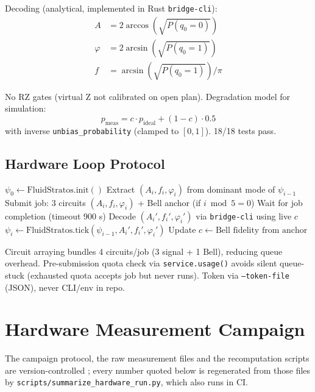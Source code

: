 \documentclass[sigconf,anonymous=false]{acmart}
\begin{document}
Decoding (analytical, implemented in Rust \texttt{bridge-cli}):
\begin{align}
A &= 2 \arccos(\sqrt{P(q_0=0)}) \\
\varphi &= 2 \arcsin(\sqrt{P(q_0=1)}) \\
f &= \arcsin(\sqrt{P(q_0=1)}) / \pi
\end{align}

No RZ gates (virtual Z not calibrated on open plan). Degradation model for simulation:
\begin{equation}
p_\text{meas} = c \cdot p_\text{ideal} + (1-c) \cdot 0.5
\end{equation}
with inverse \texttt{unbias\_probability} (clamped to $[0,1]$). 18/18 tests pass.

\subsection{Hardware Loop Protocol}

\begin{algorithm}
\caption{Quantum-Classical Hardware Loop}
\begin{algorithmic}[1]
\State $\psi_0 \gets \text{FluidStratos}.\text{init}()$
    \State Extract $(A_i, f_i, \varphi_i)$ from dominant mode of $\psi_{i-1}$
    \State Submit job: 3 circuits $(A_i, f_i, \varphi_i)$ + Bell anchor (if $i \bmod 5 = 0$)
    \State Wait for job completion (timeout 900 s)
    \State Decode $(A_i', f_i', \varphi_i')$ via \texttt{bridge-cli} using live $c$
    \State $\psi_i \gets \text{FluidStratos}.\text{tick}(\psi_{i-1}, A_i', f_i', \varphi_i')$
     \State Update $c \gets \text{Bell fidelity from anchor}$ \EndIf
\EndFor
\end{algorithmic}
\end{algorithm}

Circuit arraying bundles 4 circuits/job (3 signal + 1 Bell), reducing queue overhead. Pre-submission quota check via \texttt{service.usage()} avoids silent queue-stuck (exhausted quota accepts job but never runs). Token via \texttt{--token-file} (JSON), never CLI/env in repo.

\section{Hardware Measurement Campaign}

The campaign protocol, the raw measurement files and the recomputation scripts are
version-controlled \cite{QOI-hardware}; every number quoted below is regenerated from those
files by \texttt{scripts/summarize\_hardware\_run.py}, which also runs in CI.
\end{document}

